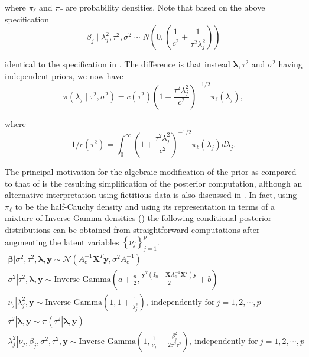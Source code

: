 \documentclass[noinfoline,11pt]{imsart}
\numberwithin{equation}{section}
\theoremstyle{plain}
\newcommand{\y}{\mathbf{y}}
\newcommand{\X}{\mathbf{X}}
\newcommand{\bb}{\boldsymbol{\beta}}
\newcommand{\bl}{\boldsymbol{\lambda}}
\begin{document}
\noindent
where $\pi_\ell$ and $\pi_\tau$ are probability densities. Note that based on the 
above specification 
$$
\beta_j \mid \lambda_j^2, \tau^2,\sigma^2 \sim N \left( 0, \left( \frac{1}{c^2}+\frac{1}{\tau^2\lambda_j^2} \right) \right)
$$

\noindent
identical to the specification in \cite{piironen2017}. The difference is that instead $\bl, \tau^2$ and $\sigma^2$ having independent priors, we now have 
\begin{equation} \label{nishimura:conditional:prior}
\pi(\lambda_j \mid \tau^2, \sigma^2) = c(\tau^2) \left( 1 + \frac{\tau^2 \lambda_j^2}{c^2} \right)^{-1/2} \pi_\ell (\lambda_j), 
\end{equation}

\noindent
where 
\begin{equation} \label{nishimura:normalizing:constant}
1/c(\tau^2) = \int_0^\infty \left( 1 + \frac{\tau^2 \lambda_j^2}{c^2} \right)^{-1/2} \pi_\ell (\lambda_j) d \lambda_j. 
\end{equation}

\noindent
The principal motivation for the algebraic modification of the prior as compared to 
that of \cite{piironen2017} is the resulting simplification of the posterior 
computation, although an alternative interpretation using fictitious data is also 
discussed in \cite{nishimura2019shrinkage}. In fact, using $\pi_\ell$ to be the half-Cauchy density 
and using its representation in terms of a mixture of Inverse-Gamma densities (\cite{Makalic_2016}) the following conditional 
posterior distributions can be obtained from straightforward computations after augmenting the latent 
variables $\left\{\nu_j\right\}_{j=1}^p$. 
\begin{eqnarray}\label{Nishimurahorseshoeposteriors}
\left.\bb\right|\sigma^2,\tau^2,\bl,\y\sim\mathcal{N}\left(A_c^{-1}\X^T\y,\sigma^2A_c^{-1}\right)\nonumber \\
\left.\sigma^2\right|\tau^2,\bl,\y\sim \text{Inverse-Gamma}\left(a+\frac{n}{2},\frac{\y^T\left(I_n-\X A_c^{-1}\X^T\right)\y}{2}+b\right)\nonumber \\
\left.\nu_j\right|\lambda_j^2,\y\sim\text{Inverse-Gamma}\left(1,1+\frac{1}{\lambda_j^2}\right),\ \text{independently for}\ j=1,2,\cdots,p\nonumber \\
\left.\tau^2\right|\bl,\y\sim\pi\left(\left.\tau^2\right|\bl,\y\right)\nonumber \\
\left.\lambda_j^2\right|\nu_j,\beta_j,\sigma^2,\tau^2,\y\sim \text{Inverse-Gamma}\left(1,\frac{1}{\nu_j}+\frac{\beta_j^2}{2\sigma^2\tau^2}\right),\ \text{independently for}\ j=1,2,\cdots,p\nonumber \\
\end{eqnarray}
\end{document}
